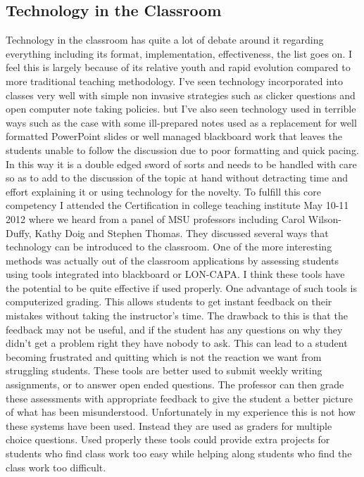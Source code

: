 \documentclass{article}
\begin{document}
\subsection{Technology in the Classroom}
\hspace{0.5cm}Technology in the classroom has quite a lot of debate around it regarding everything including its format, implementation, effectiveness, the list goes on. I feel this is largely because of its relative youth and rapid evolution compared to more traditional teaching methodology. I’ve seen technology incorporated into classes very well with simple non invasive strategies such as clicker questions and open computer note taking policies. but I’ve also seen technology used in terrible ways such as the case with some ill-prepared notes used as a replacement for well formatted PowerPoint slides or well managed blackboard work that leaves the students unable to follow the discussion due to poor formatting and quick pacing. In this way it is a double edged sword of sorts and needs to be handled with care so as to add to the discussion of the topic at hand without detracting time and effort explaining it or using technology for the novelty. 
To fulfill this core competency I attended the Certification in college teaching institute May 10-11 2012 where we heard from a panel of MSU professors including Carol Wilson-Duffy, Kathy Doig and Stephen Thomas. They discussed several ways that technology can be introduced to the classroom. 
One of the more interesting methods was actually out of the classroom applications by assessing students using tools integrated into blackboard or LON-CAPA. I think these tools have the potential to be quite effective if used properly. One advantage of such tools is computerized grading. This allows students to get instant feedback on their mistakes without taking the instructor's time. The drawback to this is that the feedback may not be useful, and if the student has any questions on why they didn't get a problem right they have nobody to ask. This can lead to a student becoming frustrated and quitting which is not the reaction we want from struggling students. These tools are better used to submit weekly writing assignments, or to answer open ended questions. The professor can then grade these assessments with appropriate feedback to give the student a better picture of what has been misunderstood. Unfortunately in my experience this is not how these systems have been used. Instead they are used as graders for multiple choice questions. Used properly these tools could provide extra projects for students who find class work too easy while helping along students who find the class work too difficult. 
\end{document}
